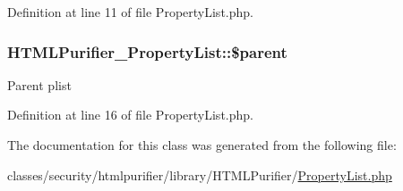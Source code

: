 Definition at line 11 of file Property\+List.\+php.

\hypertarget{classHTMLPurifier__PropertyList_a5cd68db88135d770f1df2a822d74d7dd}{
\subsubsection[{\$parent}]{\setlength{\rightskip}{0pt plus 5cm}H\+T\+M\+L\+Purifier\+\_\+\+Property\+List\+::\$parent\hspace{0.3cm}{\ttfamily [protected]}}}\label{classHTMLPurifier__PropertyList_a5cd68db88135d770f1df2a822d74d7dd}
Parent plist 

Definition at line 16 of file Property\+List.\+php.



The documentation for this class was generated from the following file\+:\begin{DoxyCompactItemize}
\item 
classes/security/htmlpurifier/library/\+H\+T\+M\+L\+Purifier/\hyperlink{PropertyList_8php}{Property\+List.\+php}\end{DoxyCompactItemize}
